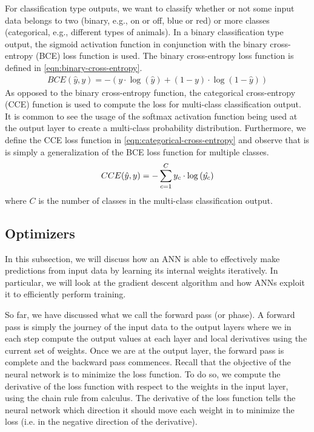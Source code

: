 For classification type outputs, we want to classify whether or not some input data belongs to two (binary, e.g., on or off, blue or red) or more classes (categorical, e.g., different types of animals). In a binary classification type output, the sigmoid activation function in conjunction with the binary cross-entropy (BCE) loss function is used. The binary cross-entropy loss function is defined in \cref{eqn:binary-cross-entropy}.
\begin{align}
    \label{eqn:binary-cross-entropy}
    BCE(\hat{y}, y) = -\left( y \cdot \log{\left( \hat{y} \right)} + (1 - y) \cdot \log{\left( 1 - \hat{y} \right)} \right)
\end{align}
As opposed to the binary cross-entropy function, the categorical cross-entropy (CCE) function is used to compute the loss for multi-class classification output. It is common to see the usage of the softmax activation function being used at the output layer to create a multi-class probability distribution. Furthermore, we define the CCE loss function in \cref{eqn:categorical-cross-entropy} and observe that is is simply a generalization of the BCE loss function for multiple classes.
\begin{align}
    \label{eqn:categorical-cross-entropy}
    CCE(\hat{y}, y) = -\sum\limits_{c=1}^{C} y_c \cdot \log{\left( \hat{y_c} \right)}
\end{align}
where $C$ is the number of classes in the multi-class classification output.

\subsection{Optimizers}
\label{sec:optimizers-ann}
In this subsection, we will discuss how an ANN is able to effectively make predictions from input data by learning its internal weights iteratively. In particular, we will look at the gradient descent algorithm and how ANNs exploit it to efficiently perform training.

So far, we have discussed what we call the forward pass (or phase). A forward pass is simply the journey of the input data to the output layers where we in each step compute the output values at each layer and local derivatives using the current set of weights. Once we are at the output layer, the forward pass is complete and the backward pass commences. Recall that the objective of the neural network is to minimize the loss function. To do so, we compute the derivative of the loss function with respect to the weights in the input layer, using the chain rule from calculus. The derivative of the loss function tells the neural network which direction it should move each weight in to minimize the loss (i.e. in the negative direction of the derivative).

